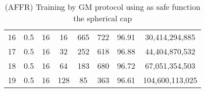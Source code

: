 \begin{table}[H]
\begin{tabular}{|c|c|c|c|c|c|c|c|}
        16                     & 0.5                   & 16                    & 16                    & 665                   & 722                   & 96.91                 & 30,414,294,885           \\
        17                     & 0.5                   & 16                    & 32                    & 252                   & 618                   & 96.88                 & 44,404,870,532           \\
        18                     & 0.5                   & 16                    & 64                    & 183                   & 680                   & 96.72                 & 67,051,354,503           \\
        19                     & 0.5                   & 16                    & 128                   & 85                    & 363                   & 96.61                 & 104,600,113,025          \\
        \hline
    \end{tabular}
    \caption{(AFFR) Training by GM protocol using as safe function the spherical cap}
    \label{tab:table-gm-sf2-nlp-exp}
\end{table}

\newpage

